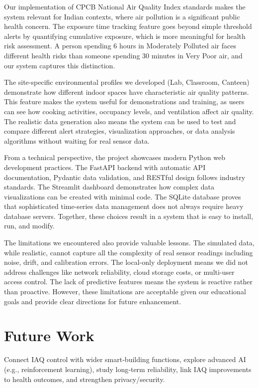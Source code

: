 \documentclass[12pt]{report}
\begin{document}
Our implementation of CPCB National Air Quality Index standards makes the system relevant for Indian contexts, where air pollution is a significant public health concern. The exposure time tracking feature goes beyond simple threshold alerts by quantifying cumulative exposure, which is more meaningful for health risk assessment. A person spending 6 hours in Moderately Polluted air faces different health risks than someone spending 30 minutes in Very Poor air, and our system captures this distinction.

The site-specific environmental profiles we developed (Lab, Classroom, Canteen) demonstrate how different indoor spaces have characteristic air quality patterns. This feature makes the system useful for demonstrations and training, as users can see how cooking activities, occupancy levels, and ventilation affect air quality. The realistic data generation also means the system can be used to test and compare different alert strategies, visualization approaches, or data analysis algorithms without waiting for real sensor data.

From a technical perspective, the project showcases modern Python web development practices. The FastAPI backend with automatic API documentation, Pydantic data validation, and RESTful design follows industry standards. The Streamlit dashboard demonstrates how complex data visualizations can be created with minimal code. The SQLite database proves that sophisticated time-series data management does not always require heavy database servers. Together, these choices result in a system that is easy to install, run, and modify.

The limitations we encountered also provide valuable lessons. The simulated data, while realistic, cannot capture all the complexity of real sensor readings including noise, drift, and calibration errors. The local-only deployment means we did not address challenges like network reliability, cloud storage costs, or multi-user access control. The lack of predictive features means the system is reactive rather than proactive. However, these limitations are acceptable given our educational goals and provide clear directions for future enhancement.

\section{Future Work}
Connect IAQ control with wider smart‑building functions, explore advanced AI (e.g., reinforcement learning), study long‑term reliability, link IAQ improvements to health outcomes, and strengthen privacy/security.
\end{document}

